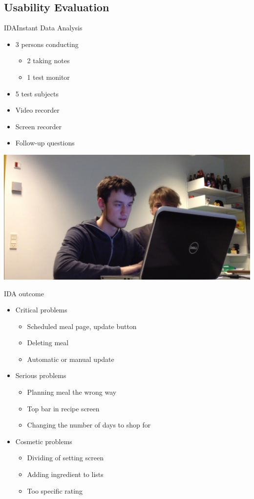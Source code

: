 \subsection{Usability Evaluation} 
\begin{frame}{IDA}{Instant Data Analysis}
	\begin{itemize}
		\item 3 persons conducting
		\begin{itemize}
            \item 2 taking notes
            \item 1 test monitor
		\end{itemize}
        \item 5 test subjects
		\item Video recorder
		\item Screen recorder
		\item Follow-up questions
	\end{itemize}
    \includegraphics[scale=0.2]{./graphics/UsabilityTest_Screenshot01}
\end{frame}

\begin{frame}{IDA outcome}
    \begin{itemize}
	\item Critical problems
		\begin{itemize}
			\item Scheduled meal page, update button
			\item Deleting meal
			\item Automatic or manual update
		\end{itemize}
	\item Serious problems
		\begin{itemize}
			\item Planning meal the wrong way
			\item Top bar in recipe screen
			\item Changing the number of days to shop for 
		\end{itemize}
	\item Cosmetic problems
		\begin{itemize}
			\item Dividing of setting screen
			\item Adding ingredient to lists
			\item Too specific rating
		\end{itemize}
    \end{itemize}
\end{frame}

